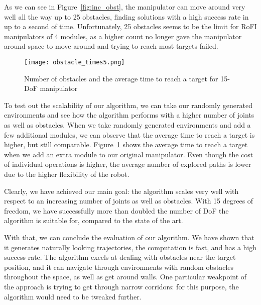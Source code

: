 As we can see in Figure~\ref{fig:inc_obst}, the manipulator can move around very well all the way up to 25 obstacles, finding solutions with a high success rate in up to a second of time. Unfortunately, 25 obstacles seems to be the limit for RoFI manipulators of 4 modules, as a higher count no longer gave the manipulator around space to move around and trying to reach most targets failed.

\begin{figure}
  \centering
  \texttt{[image: obstacle\_times5.png]}
  \caption{Number of obstacles and the average time to reach a target for 15-DoF manipulator}\label{fig:5modules}
\end{figure}

To test out the scalability of our algorithm, we can take our randomly generated environments and see how the algorithm performs with a higher number of joints as well as obstacles. When we take randomly generated environments and add a few additional modules, we can observe that the average time to reach a target is higher, but still comparable. Figure~\ref{fig:5modules} shows the average time to reach a target when we add an extra module to our original manipulator. Even though the cost of individual operations is higher, the average number of explored paths is lower due to the higher flexibility of the robot.

Clearly, we have achieved our main goal: the algorithm scales very well with respect to an increasing number of joints as well as obstacles. With 15 degrees of freedom, we have successfully more than doubled the number of DoF the algorithm is suitable for, compared to the state of the art.

With that, we can conclude the evaluation of our algorithm. We have shown that it generates naturally looking trajectories, the computation is fast, and has a high success rate. The algorithm excels at dealing with obstacles near the target position, and it can navigate through environments with random obstacles throughout the space, as well as get around walls. One particular weakpoint of the approach is trying to get through narrow corridors: for this purpose, the algorithm would need to be tweaked further.
